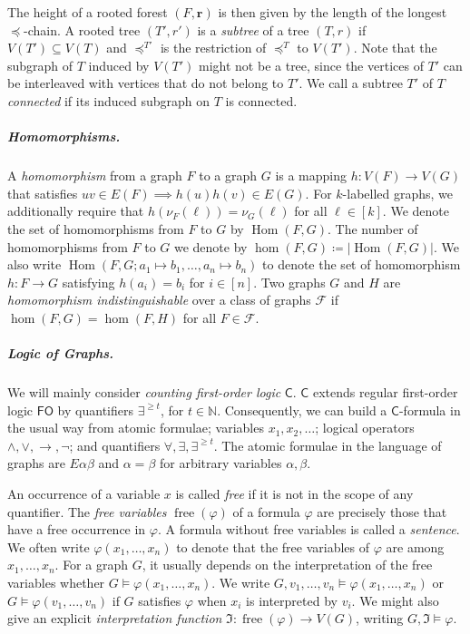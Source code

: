 \documentclass[a4paper,UKenglish,cleveref, autoref, thm-restate]{lipics-v2021}
\renewcommand{\phi}{\varphi}
\newcommand{\N}{\ensuremath{\mathbb{N}}}
\newcommand{\I}{\ensuremath{\mathfrak I}}
\newcommand{\lFO}{\ensuremath{\mathsf{FO}}}
\newcommand{\lC} {\ensuremath{\mathsf C}}
\newcommand{\impl}{\ensuremath{\rightarrow}}
\newcommand{\tup}[1]{\ensuremath{\boldsymbol{#1}}}
\DeclareMathOperator{\free}{free}
\DeclareMathOperator{\HOM}{Hom}
\begin{document}
The height of a rooted forest $(F, \tup{r})$ is then given by the length of the longest $\preceq$-chain. A rooted tree $(T', r')$ is a \emph{subtree} of a tree $(T, r)$ if $V(T') \subseteq V(T)$ and $\preceq^{T'}$ is the restriction of $\preceq^T$ to $V(T')$. Note that the subgraph of $T$ induced by $V(T')$ might not be a tree, since the vertices of $T'$ can be interleaved with vertices that do not belong to $T'$. We call a subtree $T'$ of $T$ \emph{connected} if its induced subgraph on $T$ is connected.

\subparagraph{Homomorphisms.}
A \emph{homomorphism} from a graph $F$ to a graph $G$ is a mapping $h \colon V(F) \to V(G)$ that satisfies $uv \in E(F) \implies h(u)h(v) \in E(G)$. For $k$-labelled graphs, we additionally require that $h(\nu_F(\ell)) = \nu_G(\ell)$ for all $\ell \in [k]$.
We denote the set of homomorphisms from $F$ to $G$ by $\HOM(F, G)$. The number of homomorphisms from $F$ to $G$ we denote by $\hom(F, G) \coloneqq |\HOM(F, G)|$. We also write $\HOM(F, G; a_1 \mapsto b_1, \dots, a_n \mapsto b_n)$ to denote the set of homomorphism $h\colon F \to G$ satisfying $h(a_i) = b_i$ for $i \in [n]$.
Two graphs $G$ and $H$ are \emph{homomorphism indistinguishable} over a class of graphs $\mathcal{F}$ if $\hom(F, G) = \hom(F, H)$ for all $F \in \mathcal{F}$.

\subparagraph{Logic of Graphs.}



We will mainly consider \emph{counting first-order logic} $\lC$. $\lC$ extends regular first-order logic $\lFO$ by quantifiers $\exists^{\geq t}$, for $t \in \N$. Consequently, we can build a $\lC$-formula in the usual way from atomic formulae; variables $x_1, x_2, \dots$; logical operators $\land, \lor, \impl, \neg$; and quantifiers $\forall, \exists, \exists^{\geq t}$. The atomic formulae in the language of graphs are $E\alpha\beta$ and $\alpha = \beta$ for arbitrary variables $\alpha, \beta$.

An occurrence of a variable $x$ is called \emph{free} if it is not in the scope of any quantifier. The \emph{free variables} $\free(\phi)$ of a formula $\phi$ are precisely those that have a free occurrence in $\phi$. A formula without free variables is called a \emph{sentence}. We often write $\phi(x_1, \dots, x_n)$ to denote that the free variables of $\phi$ are among $x_1, \dots, x_n$. For a graph $G$, it usually depends on the interpretation of the free variables whether $G \models \phi(x_1, \dots, x_n)$. We write $G, v_1, \dots, v_n \models \phi(x_1, \dots, x_n)$ or $G \models \phi(v_1, \dots, v_n)$ if $G$ satisfies $\phi$ when $x_i$ is interpreted by $v_i$. We might also give an explicit \emph{interpretation function} $\I \colon \free(\phi) \to V(G)$, writing $G, \I \models \phi$.
\end{document}
